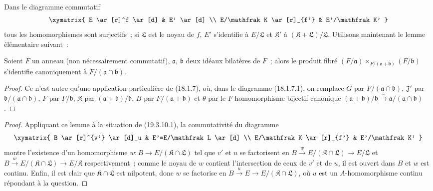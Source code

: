 Dans le diagramme commutatif
\[
\xymatrix{
  E \ar[r]^f \ar[d] & E' \ar[d] \\
  E/\mathfrak K \ar[r]_{f'} & E'/\mathfrak K'
}
\]
tous les homomorphismes sont surjectifs~; si $\mathfrak L$ est le noyau de
$f$, $E'$ s'identifie à $E/\mathfrak L$ et $\mathfrak K'$ à
$(\mathfrak K+\mathfrak L)/\mathfrak L$. Utilisons maintenant le lemme
élémentaire suivant~:

\begin{lemma}[19.3.10.2]
\label{0.19.3.10.2-fr}
Soient $F$ un anneau (non nécessairement commutatif), $\mathfrak a$,
$\mathfrak b$ deux idéaux bilatères de $F$~; alors le produit fibré
$(F/\mathfrak a)\times_{F/(\mathfrak a+\mathfrak b)}(F/\mathfrak b)$
s'identifie canoniquement à $F/(\mathfrak a\cap\mathfrak b)$.
\end{lemma}

\begin{proof}
Ce n'est autre qu'une application particulière de (18.1.7), où, dans le
diagramme (18.1.7.1), on remplace $G$ par
$F/(\mathfrak a\cap\mathfrak b)$, $\mathfrak J'$ par
$\mathfrak b/(\mathfrak a\cap\mathfrak b)$, $F$ par
$F/\mathfrak b$, $\mathfrak K$ par
$(\mathfrak a+\mathfrak b)/\mathfrak b$, $B$ par
$F/(\mathfrak a+\mathfrak b)$ et $\theta$ par le $F$-homomorphisme
bijectif canonique
$(\mathfrak a+\mathfrak b)/\mathfrak b\xrightarrow{\sim}
\mathfrak a/(\mathfrak a\cap\mathfrak b)$.
\end{proof}


\begin{proof}
Appliquant ce lemme à la situation de (19.3.10.1), la commutativité du
diagramme
\[
\xymatrix{
  B \ar[r]^{v'} \ar[d]_u & E'=E/\mathfrak L \ar[d] \\
  E/\mathfrak K \ar[r]_{f'} & E'/\mathfrak K'
}
\]
montre l'existence d'un homomorphisme
$w:B\to E/(\mathfrak K\cap\mathfrak L)$ tel que $v'$ et $u$ se
factorisent en
$B\xrightarrow{w}E/(\mathfrak K\cap\mathfrak L)\to E/\mathfrak L$
et
$B\xrightarrow{w}E/(\mathfrak K\cap\mathfrak L)\to E/\mathfrak K$
respectivement~; comme le noyau de $w$ contient l'intersection de ceux de
$v'$ et de $u$, il est ouvert dans $B$ et $w$ est continu. Enfin, il est clair
que $\mathfrak K\cap\mathfrak L$ est nilpotent, donc $w$ se factorise en
$B\xrightarrow{u}E\to E/(\mathfrak K\cap\mathfrak L)$, où $u$ est
un $A$-homomorphisme continu répondant à la question.
\end{proof}


